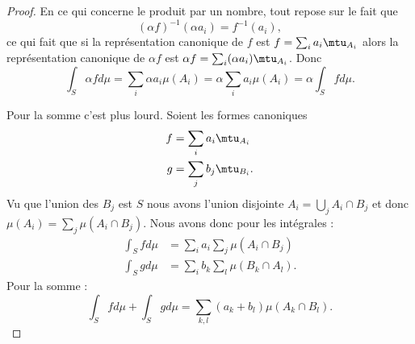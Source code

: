 \begin{proof}
    En ce qui concerne le produit par un nombre, tout repose sur le fait que
    \begin{equation}
        (\alpha f)^{-1}(\alpha a_i)=f^{-1}(a_i), 
    \end{equation}
    ce qui fait que si la représentation canonique de \( f\) est \( f=\sum_ia_i\mtu_{A_i}\) alors la représentation canonique de \( \alpha f\) est \( \alpha f=\sum_i(\alpha a_i)\mtu_{A_i}\). Donc
    \begin{equation}
        \int_S\alpha fd\mu=\sum_i\alpha a_i\mu(A_i)=\alpha \sum_ia_i\mu(A_i)=\alpha\int_Sfd\mu.
    \end{equation}
    
    Pour la somme c'est plus lourd. Soient les formes canoniques
    \begin{subequations}
        \begin{align}
            f&=\sum_ia_i\mtu_{A_i}\\
            g&=\sum_jb_j\mtu_{B_i}.
        \end{align}
    \end{subequations}
    Vu que l'union des \( B_j\) est \( S\) nous avons l'union disjointe \( A_i=\bigcup_jA_i\cap B_j\) et donc \( \mu(A_i)=\sum_j\mu(A_i\cap B_j)\). Nous avons donc pour les intégrales :
    \begin{subequations}
        \begin{align}
            \int_Sfd\mu&=\sum_ia_i\sum_j\mu(A_i\cap B_j)\\
            \int_Sgd\mu&=\sum_ib_k\sum_l\mu(B_k\cap A_l).
        \end{align}
    \end{subequations}
    Pour la somme :
    \begin{equation}
        \int_Sfd\mu+\int_Sgd\mu=\sum_{k,l}(a_k+b_l)\mu(A_k\cap B_l).
    \end{equation}


\end{proof}
